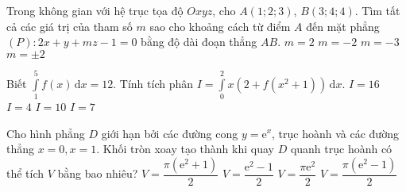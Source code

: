 \begin{ex}%
Trong không gian với hệ trục tọa độ $Oxyz$, cho $A(1; 2; 3)$, $B(3; 4; 4)$. Tìm tất cả các giá trị của tham số $m$ sao cho khoảng cách từ điểm $A$ đến mặt phẳng $(P)\colon 2x + y + mz - 1 = 0$ bằng độ dài đoạn thẳng $AB$.
\choice
{\True $m = 2$}
{$m = -2$}
{$m = -3$}
{$m = \pm 2$}
\end{ex}


\begin{ex}%
Biết $\displaystyle \int\limits_1^5 f(x)\, \mathrm{d} x = 12$. Tính tích phân $I = \displaystyle \int\limits_0^2 x \left(2 + f(x^2 + 1)\right) \, \mathrm{d}x$.
\choice
{$I = 16$}
{$I = 4$}
{\True $I = 10$}
{$I = 7$}
\end{ex}


\begin{ex}%
Cho hình phẳng $D$ giới hạn bởi các đường cong $y = \mathrm{e}^x$, trục hoành và các đường thẳng $x = 0, x = 1$. Khối tròn xoay tạo thành khi quay $D$ quanh trục hoành có thể tích $V$ bằng bao nhiêu?
\choice
{$V = \dfrac{\pi \left(\mathrm{e}^2 + 1\right)}{2}$}
{$V = \dfrac{\mathrm{e}^2 - 1}{2}$}
{$V = \dfrac{\pi \mathrm{e}^2}{2}$}
{\True $V = \dfrac{\pi\left(\mathrm{e}^2 - 1\right)}{2}$}
\end{ex}


